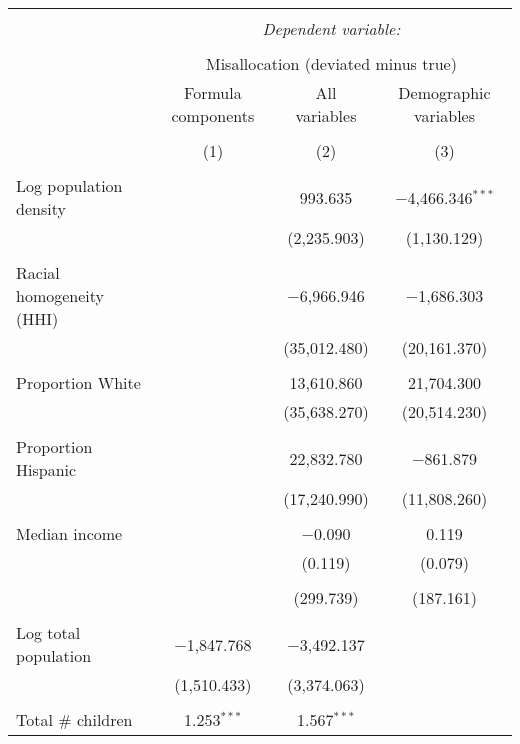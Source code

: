
\begin{table}[!htbp] \centering 
  \caption{} 
  \label{} 
\begin{tabular}{@{\extracolsep{5pt}}lccc} 
\\[-1.8ex]\hline 
\hline \\[-1.8ex] 
 & \multicolumn{3}{c}{\textit{Dependent variable:}} \\ 
\cline{2-4} 
\\[-1.8ex] & \multicolumn{3}{c}{Misallocation (deviated minus true)} \\ 
 & Formula components & All variables & Demographic variables \\ 
\\[-1.8ex] & (1) & (2) & (3)\\ 
\hline \\[-1.8ex] 
 Log population density &  & 993.635 & $-$4,466.346$^{***}$ \\ 
  &  & (2,235.903) & (1,130.129) \\ 
  & & & \\ 
 Racial homogeneity (HHI) &  & $-$6,966.946 & $-$1,686.303 \\ 
  &  & (35,012.480) & (20,161.370) \\ 
  & & & \\ 
 Proportion White &  & 13,610.860 & 21,704.300 \\ 
  &  & (35,638.270) & (20,514.230) \\ 
  & & & \\ 
 Proportion Hispanic &  & 22,832.780 & $-$861.879 \\ 
  &  & (17,240.990) & (11,808.260) \\ 
  & & & \\ 
 Median income &  & $-$0.090 & 0.119 \\ 
  &  & (0.119) & (0.079) \\ 
  & & & \\ 
  &  & (299.739) & (187.161) \\ 
  & & & \\ 
 Log total population & $-$1,847.768 & $-$3,492.137 &  \\ 
  & (1,510.433) & (3,374.063) &  \\ 
  & & & \\ 
 Total # children & 1.253$^{***}$ & 1.567$^{***}$ &  \\ 

\end{tabular}
\end{table}
